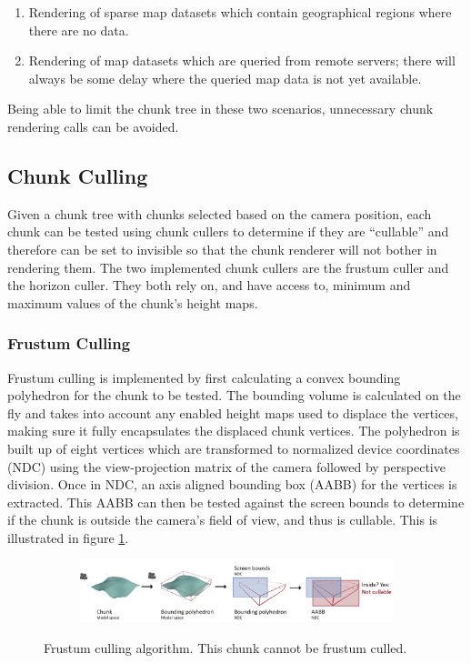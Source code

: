 \begin{enumerate}
\item Rendering of sparse map datasets which contain geographical regions where there are no data.
\item Rendering of map datasets which are queried from remote servers; there will always be some delay where the queried map data is not yet available.
\end{enumerate}

Being able to limit the chunk tree in these two scenarios, unnecessary chunk rendering calls can be avoided.

\subsection{Chunk Culling}
Given a chunk tree with chunks selected based on the camera position, each chunk can be tested using chunk cullers to determine if they are ``cullable'' and therefore can be set to invisible so that the chunk renderer will not bother in rendering them. The two implemented chunk cullers are the frustum culler and the horizon culler. They both rely on, and have access to, minimum and maximum values of the chunk's height maps. 

\subsubsection{Frustum Culling}
Frustum culling is implemented by first calculating a convex bounding polyhedron for the chunk to be tested. The bounding volume is calculated on the fly and takes into account any enabled height maps used to displace the vertices, making sure it fully encapsulates the displaced chunk vertices. The polyhedron is built up of eight vertices which are transformed to normalized device coordinates (NDC) using the view-projection matrix of the camera followed by perspective division. Once in NDC, an axis aligned bounding box (AABB) for the vertices is extracted. This AABB can then be tested against the screen bounds to determine if the chunk is outside the camera's field of view, and thus is cullable. This is illustrated in figure \ref{fig:frustumculling}.

\begin{figure}[htbp]
    \centering
    \begin{subfigure}[bt]{1.0\textwidth}
        \includegraphics[width=\textwidth]{figures/implementation/chunklod/frustumculling.pdf}
    \end{subfigure}
    \caption{Frustum culling algorithm. This chunk cannot be frustum culled.}
    \label{fig:frustumculling}
\end{figure}

